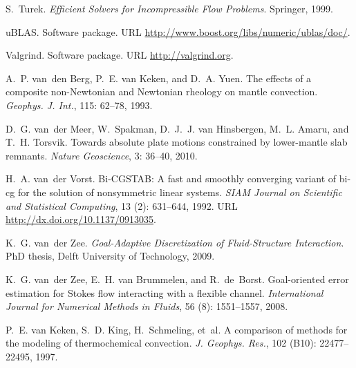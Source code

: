 \begin{thebibliography}{467}
S.~Turek.
\newblock \emph{Efficient Solvers for Incompressible Flow Problems}.
\newblock Springer, 1999.

uBLAS.
\newblock Software package.
\newblock URL \url{http://www.boost.org/libs/numeric/ublas/doc/}.

Valgrind.
\newblock Software package.
\newblock URL \url{http://valgrind.org}.

A.~P. van~den Berg, P.~E. van Keken, and D.~A. Yuen.
\newblock The effects of a composite non-{N}ewtonian and {N}ewtonian rheology
  on mantle convection.
\newblock \emph{Geophys. J. Int.}, 115: 62--78, 1993.

D.~G. van~der Meer, W.~Spakman, D.~J.~J. van Hinsbergen, M.~L. Amaru, and T.~H.
  Torsvik.
\newblock Towards absolute plate motions constrained by lower-mantle slab
  remnants.
\newblock \emph{Nature Geoscience}, 3: 36--40, 2010.

H.~A. van~der Vorst.
\newblock Bi-{CGSTAB}: A fast and smoothly converging variant of bi-cg for the
  solution of nonsymmetric linear systems.
\newblock \emph{SIAM Journal on Scientific and Statistical Computing},
  13 (2): 631--644, 1992.
\newblock URL \url{http://dx.doi.org/10.1137/0913035}.

K.~G. van~der Zee.
\newblock \emph{Goal-Adaptive Discretization of Fluid-Structure Interaction}.
\newblock PhD thesis, Delft University of Technology, 2009.

K.~G. van~der Zee, E.~H. van Brummelen, and R.~de~Borst.
\newblock Goal-oriented error estimation for {S}tokes flow interacting with a
  flexible channel.
\newblock \emph{International Journal for Numerical Methods in Fluids},
  56 (8): 1551--1557, 2008.

P.~E. van Keken, S.~D. King, H.~Schmeling, et~al.
\newblock A comparison of methods for the modeling of thermochemical
  convection.
\newblock \emph{J. Geophys. Res.}, 102 (B10): 22477--22495,
  1997.


\end{thebibliography}
